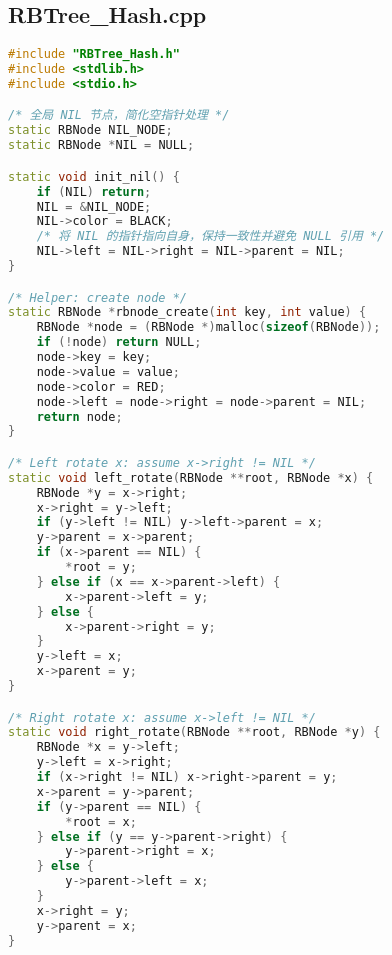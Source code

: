 \documentclass[12pt,a4paper]{article}
\begin{document}
\subsection{RBTree\_Hash.cpp}
\begin{lstlisting}[language=C++,caption=RBTree\_Hash.cpp]
#include "RBTree_Hash.h"
#include <stdlib.h>
#include <stdio.h>

/* 全局 NIL 节点，简化空指针处理 */
static RBNode NIL_NODE;
static RBNode *NIL = NULL;

static void init_nil() {
    if (NIL) return;
    NIL = &NIL_NODE;
    NIL->color = BLACK;
    /* 将 NIL 的指针指向自身，保持一致性并避免 NULL 引用 */
    NIL->left = NIL->right = NIL->parent = NIL;
}

/* Helper: create node */
static RBNode *rbnode_create(int key, int value) {
    RBNode *node = (RBNode *)malloc(sizeof(RBNode));
    if (!node) return NULL;
    node->key = key;
    node->value = value;
    node->color = RED;
    node->left = node->right = node->parent = NIL;
    return node;
}

/* Left rotate x: assume x->right != NIL */
static void left_rotate(RBNode **root, RBNode *x) {
    RBNode *y = x->right;
    x->right = y->left;
    if (y->left != NIL) y->left->parent = x;
    y->parent = x->parent;
    if (x->parent == NIL) {
        *root = y;
    } else if (x == x->parent->left) {
        x->parent->left = y;
    } else {
        x->parent->right = y;
    }
    y->left = x;
    x->parent = y;
}

/* Right rotate x: assume x->left != NIL */
static void right_rotate(RBNode **root, RBNode *y) {
    RBNode *x = y->left;
    y->left = x->right;
    if (x->right != NIL) x->right->parent = y;
    x->parent = y->parent;
    if (y->parent == NIL) {
        *root = x;
    } else if (y == y->parent->right) {
        y->parent->right = x;
    } else {
        y->parent->left = x;
    }
    x->right = y;
    y->parent = x;
}


\end{lstlisting}
\end{document}
